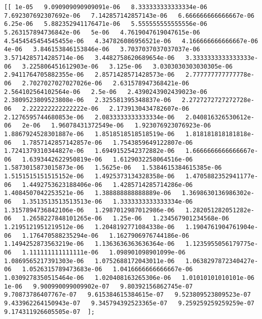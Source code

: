 \documentclass[11pt]{article}
\begin{document}
    \begin{Verbatim}[commandchars=\\\{\}]
[[ 1e-05   9.090909090909091e-06   8.333333333333334e-06   7.692307692307692e-06   7.142857142857143e-06   6.666666666666667e-06   6.25e-06   5.882352941176471e-06   5.555555555555556e-06   5.263157894736842e-06   5e-06   4.7619047619047615e-06   4.5454545454545455e-06   4.347826086956521e-06   4.166666666666667e-06   4e-06   3.846153846153846e-06   3.7037037037037037e-06   3.5714285714285714e-06   3.4482758620689654e-06   3.3333333333333333e-06   3.225806451612903e-06   3.125e-06   3.0303030303030305e-06   2.9411764705882355e-06   2.8571428571428573e-06   2.777777777777778e-06   2.7027027027027026e-06   2.631578947368421e-06   2.564102564102564e-06   2.5e-06   2.4390243902439023e-06   2.3809523809523808e-06   2.325581395348837e-06   2.2727272727272728e-06   2.222222222222222e-06   2.1739130434782607e-06   2.1276595744680853e-06   2.0833333333333334e-06   2.040816326530612e-06   2e-06   1.96078431372549e-06   1.923076923076923e-06   1.8867924528301887e-06   1.8518518518518519e-06   1.818181818181818e-06   1.7857142857142857e-06   1.7543859649122807e-06   1.7241379310344827e-06   1.6949152542372882e-06   1.6666666666666667e-06   1.6393442622950819e-06   1.6129032258064516e-06   1.5873015873015873e-06   1.5625e-06   1.5384615384615385e-06   1.5151515151515152e-06   1.4925373134328358e-06   1.4705882352941177e-06   1.4492753623188406e-06   1.4285714285714286e-06   1.4084507042253521e-06   1.388888888888889e-06   1.3698630136986302e-06   1.3513513513513513e-06   1.3333333333333334e-06   1.3157894736842106e-06   1.2987012987012986e-06   1.282051282051282e-06   1.2658227848101265e-06   1.25e-06   1.234567901234568e-06   1.2195121951219512e-06   1.2048192771084338e-06   1.1904761904761904e-06   1.176470588235294e-06   1.1627906976744186e-06   1.1494252873563219e-06   1.1363636363636364e-06   1.1235955056179775e-06   1.111111111111111e-06   1.098901098901099e-06   1.0869565217391303e-06   1.0752688172043011e-06   1.0638297872340427e-06   1.0526315789473683e-06   1.0416666666666667e-06   1.0309278350515464e-06   1.020408163265306e-06   1.01010101010101e-06   1e-06   9.900990099009902e-07   9.80392156862745e-07   9.70873786407767e-07   9.615384615384615e-07   9.523809523809523e-07   9.433962264150943e-07   9.345794392523365e-07   9.259259259259259e-07   9.174311926605505e-07  ];

\end{Verbatim}
\end{document}
